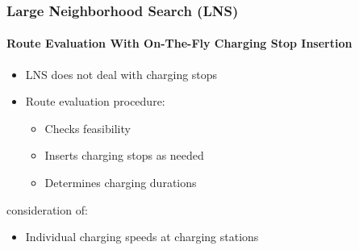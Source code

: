 \documentclass[aspectratio=1610]{beamer}
\begin{document}
\begin{frame}
	\frametitle{Large Neighborhood Search (LNS)}
	\framesubtitle{Route Evaluation With On-The-Fly Charging Stop Insertion}
	
\begin{itemize}
	\item LNS does not deal with charging stops
	\medskip 
	\item Route evaluation procedure: 
		\smallskip
		\begin{itemize}
			\item Checks feasibility 
			\smallskip
			\item Inserts charging stops as needed 
			\smallskip
			\item Determines charging durations 
		\end{itemize}
\end{itemize}

\bigskip

%

 consideration of: 
\smallskip
\begin{itemize}
	\item Individual charging speeds at charging stations
\end{itemize}
	
\end{frame}
\end{document}
